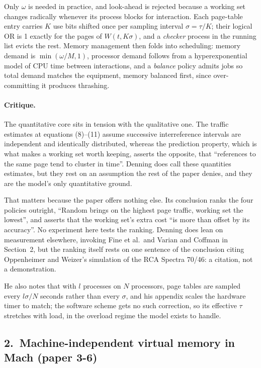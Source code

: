 Only $\omega$ is needed in practice, and look-ahead is rejected because a working set
changes radically whenever its process blocks for interaction. Each page-table entry
carries $K$ use bits shifted once per sampling interval $\sigma=\tau/K$; their logical
OR is 1 exactly for the pages of $W(t,K\sigma)$, and a \emph{checker} process in the
running list evicts the rest. Memory management then folds into scheduling: memory
demand is $\min(\omega/M,1)$, processor demand follows from a hyperexponential model of
CPU time between interactions, and a \emph{balance} policy admits jobs so total demand
matches the equipment, memory balanced first, since over-committing it produces
thrashing.

\paragraph{Critique.}
The quantitative core sits in tension with the qualitative one. The traffic estimates at
equations (8)--(11) assume successive interreference intervals are independent and
identically distributed, whereas the prediction property, which is what makes a working
set worth keeping, asserts the opposite, that ``references to the same page tend to
cluster in time''. Denning
does call these quantities estimates, but they rest on an assumption the rest of the
paper denies, and they are the model's only quantitative ground.

That matters because the paper offers nothing else. Its conclusion ranks the four
policies outright, ``Random brings on the highest page traffic, working set the lowest'',
and asserts that the working set's extra cost ``is more than offset by its accuracy''.
No experiment here tests the ranking. Denning does lean on measurement elsewhere,
invoking Fine et al.\ and Varian and Coffman in Section~2, but the ranking itself rests on
one sentence of the conclusion citing
Oppenheimer and Weizer's simulation of the RCA Spectra 70/46: a citation, not a
demonstration.

He also notes that with $l$ processes on $N$ processors, page tables are sampled every
$l\sigma/N$ seconds rather than every $\sigma$, and his appendix scales the hardware timer
to match; the software scheme gets no such correction, so its effective $\tau$ stretches
with load, in the overload regime the model exists to handle.

\subsection*{2.~Machine-independent virtual memory in Mach (paper 3-6)}

